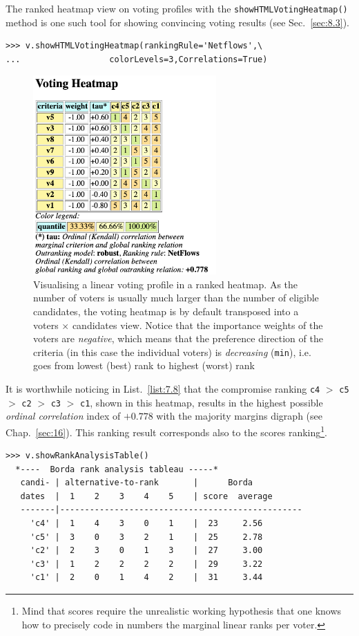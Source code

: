 The \NetFlows ranked heatmap view on voting profiles with the \texttt{showHTML\-VotingHeatmap()} method is one such tool for showing convincing voting results (see Sec.~\ref{sec:8.3}).
\begin{lstlisting}[caption={\NetFlows ranked heatmap view on a voting profile},label=list:7.8]
>>> v.showHTMLVotingHeatmap(rankingRule='Netflows',\
...                  colorLevels=3,Correlations=True)
\end{lstlisting}
\begin{figure}[ht]
\sidecaption[t]
\includegraphics[width=7cm]{Figures/7-3-votingHeatmap.png}
\caption[Visualising a linear voting profile in a \NetFlows ranked heatmap]{Visualising a linear voting profile in a \NetFlows ranked heatmap. As the number of voters is usually much larger than the number of eligible candidates, the voting heatmap is by default transposed into a voters $\times$ candidates view. Notice that the importance weights of the voters are \emph{negative}, which means that the preference direction of the criteria (in this case the individual voters) is \emph{decreasing} (\texttt{min}), i.e. goes from lowest (best) rank to highest (worst) rank}
\label{fig:7.3}       %
\end{figure}

It is worthwhile noticing in List.~\vref{list:7.8} that the compromise \NetFlows ranking \texttt{c4} $>$ \texttt{c5} $>$ \texttt{c2} $>$ \texttt{c3} $>$ \texttt{c1}, shown in this heatmap, results in the highest possible \emph{ordinal correlation} index of $+0.778$ with the majority margins digraph (see Chap.~\ref{sec:16}). This \NetFlows ranking result corresponds also to the \Borda scores ranking\footnote{Mind that \Borda scores require the unrealistic working hypothesis that one knows how to precisely code in numbers the marginal linear ranks per voter.}.
\begin{lstlisting}
>>> v.showRankAnalysisTable()
  *----  Borda rank analysis tableau -----*
   candi- | alternative-to-rank       |      Borda
   dates  |  1    2    3    4    5    | score  average
   -------|-------------------------------------------------
     'c4' |  1    4    3    0    1    |  23     2.56
     'c5' |  3    0    3    2    1    |  25     2.78
     'c2' |  2    3    0    1    3    |  27     3.00
     'c3' |  1    2    2    2    2    |  29     3.22
     'c1' |  2    0    1    4    2    |  31     3.44
\end{lstlisting}

